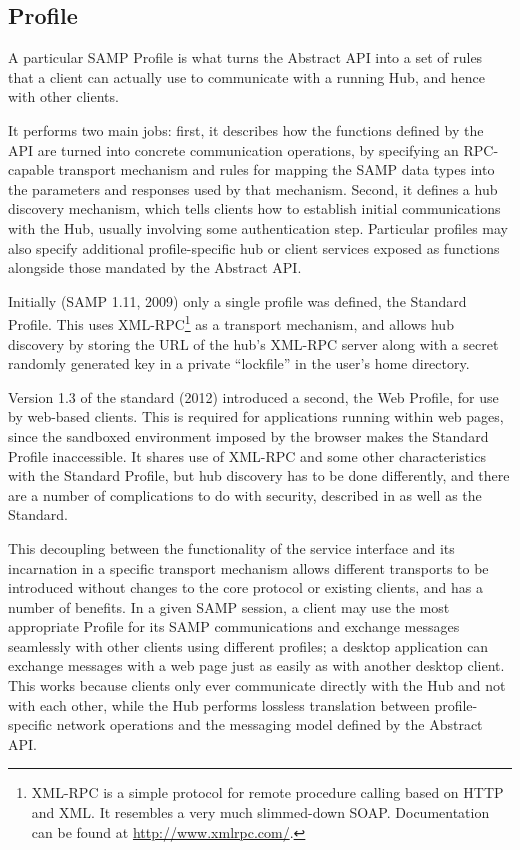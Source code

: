 \documentclass[5p]{elsarticle}
\begin{document}
\subsection{Profile} \label{sec:profile}

A particular SAMP Profile is what
turns the Abstract API into a set of rules
that a client can actually use to communicate with a running Hub,
and hence with other clients.

It performs two main jobs: first, it describes
how the functions defined by the API are turned into concrete
communication operations, by specifying an RPC-capable
transport mechanism and rules for mapping the SAMP
data types into the parameters and responses used by that mechanism.
Second, it defines a hub discovery mechanism,
which tells clients how to establish initial communications with the Hub,
usually involving some authentication step.
Particular profiles may also specify additional
profile-specific hub or client services exposed as functions
alongside those mandated by the Abstract API.

Initially (SAMP 1.11, 2009)
only a single profile was defined, the Standard Profile.
This uses XML-RPC\footnote{
   XML-RPC is a simple protocol for remote procedure calling
   based on HTTP and XML. It resembles a very much slimmed-down SOAP.
   Documentation can be found at \url{http://www.xmlrpc.com/}.
}
as a transport mechanism,
and allows hub discovery by storing the URL of the hub's XML-RPC server
along with a secret randomly generated key in a private ``lockfile''
in the user's home directory.

Version 1.3 of the standard (2012) introduced a second, the Web Profile,
for use by web-based clients.
This is required for applications running within web pages,
since the sandboxed environment imposed by the browser
makes the Standard Profile inaccessible.
It shares use of XML-RPC and some other characteristics with the
Standard Profile, but hub discovery has to be done differently,
and there are a number of complications to do with security,
described in \citet{adassxxi_paper} as well as the Standard.

This decoupling between the functionality of the service interface
and its incarnation in a specific transport mechanism
allows different transports to be introduced without changes to the core
protocol or existing clients, and has a number of benefits.
In a given SAMP session, a client may use the most appropriate
Profile for its SAMP communications and exchange
messages seamlessly with other clients using different profiles;
a desktop application can exchange messages with a web page
just as easily as with another desktop client.
This works because clients only ever
communicate directly with the Hub and not with each other,
while the Hub performs lossless translation between
profile-specific network operations
and the messaging model defined by the Abstract API.
\end{document}
